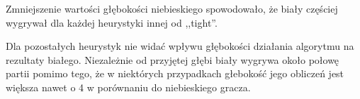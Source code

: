 Zmniejszenie wartości głębokości niebieskiego spowodowało, że biały częściej
wygrywał dla każdej heurystyki innej od ,,tight''. 

Dla pozostałych heurystyk nie widać wpływu głębokości działania algorytmu na
rezultaty białego. Niezależnie od przyjętej głębi biały wygrywa około połowę
partii pomimo tego, że w niektórych przypadkach głebokość jego obliczeń jest
większa nawet o 4 w porównaniu do niebieskiego gracza.

